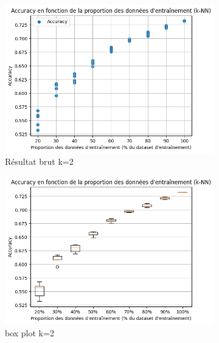 \documentclass[12pt]{article}
\begin{document}
\begin{figure}[H]
    \centering
    \begin{subfigure}[t]{0.35\textwidth}
        \centering
        \includegraphics[width=\textwidth]{static/knn_cam_2_raw.png} 
        \caption{Résultat brut k=2}
    \end{subfigure}
    \hfill
    \begin{subfigure}[t]{0.35\textwidth}
        \centering
        \includegraphics[width=\textwidth]{static/knn_cam_2.png}
        \caption{box plot k=2}
    \end{subfigure}
    \hfill
    \begin{subfigure}[t]{0.35\textwidth}
        \centering

\end{subfigure}
\end{figure}
\end{document}
